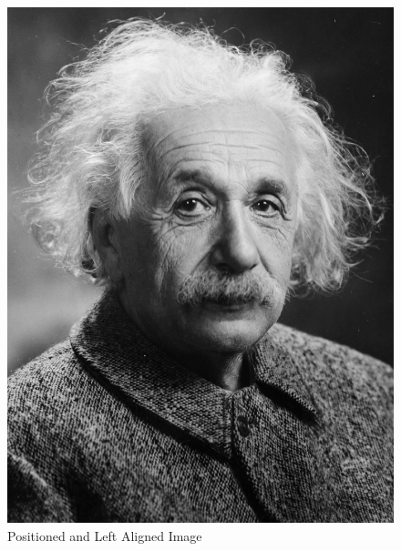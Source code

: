 \documentclass{article}
\begin{document}
\begin{figure}[htbp]
    \includegraphics{Images/Albert_Einstein.png}
    \caption{Positioned and Left Aligned Image}
\end{figure}

\pagebreak
\end{document}
